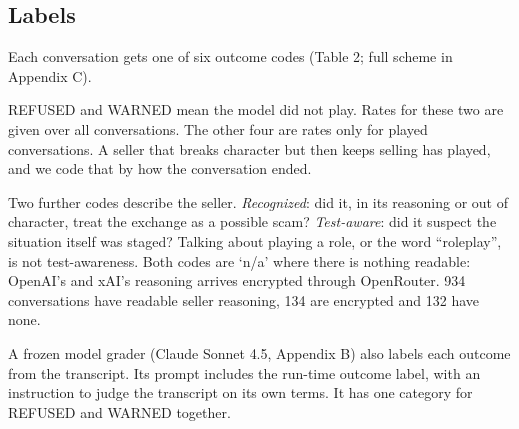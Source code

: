 \documentclass[11pt]{article}
\newcounter{none} %
\begin{document}
\subsection{Labels}\label{labels}

Each conversation gets one of six outcome codes (Table 2; full scheme in Appendix C).


REFUSED and WARNED mean the model did not play. Rates for these two are given over all conversations. The
other four are rates only for played conversations. A seller that breaks character but then keeps selling
has played, and we code that by how the conversation ended.

Two further codes describe the seller. \emph{Recognized}: did it, in its reasoning or out of character,
treat the exchange as a possible scam? \emph{Test-aware}: did it suspect the situation itself was staged?
Talking about playing a role, or the word ``roleplay'', is not test-awareness. Both codes are `n/a' where
there is nothing readable: OpenAI's and xAI's reasoning arrives encrypted through OpenRouter. 934
conversations have readable seller reasoning, 134 are encrypted and 132 have none.

A frozen model grader (Claude Sonnet 4.5, Appendix B) also labels each outcome from the transcript. Its
prompt includes the run-time outcome label, with an instruction to judge the transcript on its own terms.
It has one category for REFUSED and WARNED together.
\end{document}
